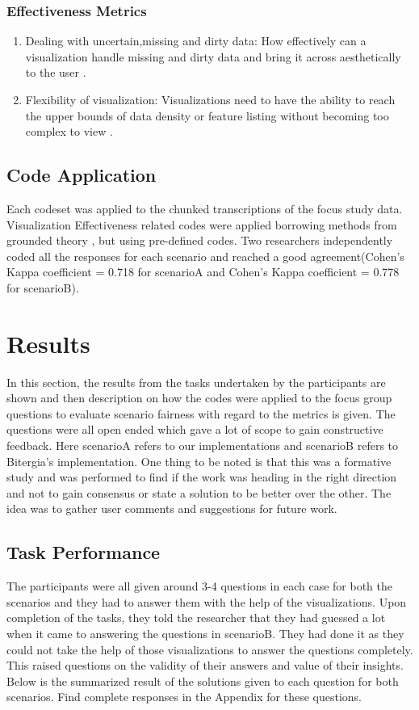 \documentclass[seploa]{beavtex}
\begin{document}
\subsection{Effectiveness Metrics}

\begin{enumerate}
\item Dealing with uncertain,missing and dirty data: How effectively can a visualization handle missing and dirty data and bring it across aesthetically to the user \cite{grins2001}.

\item Flexibility of visualization: Visualizations need to have the ability to reach the upper bounds of data density or feature listing without becoming too complex to view \cite{grins2001}.
\end{enumerate}

\section{Code Application}
Each codeset was applied to the chunked transcriptions of the focus study data. Visualization Effectiveness related  codes  were  applied borrowing methods from  grounded theory \cite{corbin2008}, but using pre-­defined codes. Two researchers independently coded all the responses for each scenario and reached a good agreement(Cohen’s  Kappa  coefficient  =  0.718 for scenarioA and Cohen’s  Kappa  coefficient  =  0.778 for scenarioB).

\chapter{Results}
In this section, the results from the tasks undertaken by the participants are shown and then description on how the codes were applied to the focus group questions to evaluate scenario fairness with regard to the metrics is given. The questions were all open ended which gave a lot of scope to gain constructive feedback. Here scenarioA refers to our implementations and scenarioB refers to Bitergia's implementation. One thing to be noted is that this was a formative study and was performed to find if the work was heading in the right direction and not to gain consensus or state a solution to be better over the other. The idea was to gather user comments and suggestions for future work.

\section{Task Performance}
The participants were all given around 3-4 questions in each case for both the scenarios and they had to answer them with the help of the visualizations. Upon completion of the tasks, they told the researcher that they had guessed a lot when it came to answering the questions in scenarioB. They had done it as they could not take the help of those visualizations to answer the questions completely. This raised questions on the validity of their answers and value of their insights. Below is the summarized result of the solutions given to each question for both scenarios. Find complete responses in the Appendix for these questions.
\end{document}
